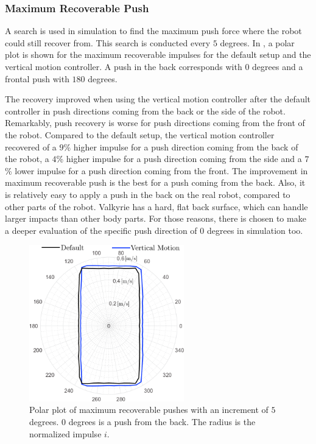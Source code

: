 \subsubsection{Maximum Recoverable Push} 
A search is used in simulation to find the maximum push force where the robot could still recover from. This search is conducted every $5$ degrees.  In , a polar plot is shown for the maximum recoverable impulses for the default setup and the vertical motion controller. A push in the back corresponds with $0$ degrees and a frontal push with $180$ degrees.

The recovery improved when using the vertical motion controller after the default controller in push directions coming from the back or the side of the robot. Remarkably, push recovery is worse for push directions coming from the front of the robot. Compared to the default setup, the vertical motion controller recovered of a $9$\% higher impulse for a push direction coming from the back of the robot, a $4$\% higher impulse for a push direction coming from the side and a $7$\% lower impulse for a push direction coming from the front. The improvement in maximum recoverable push is the best for a push coming from the back. Also, it is relatively easy to apply a push in the back on the real robot, compared to other parts of the robot. Valkyrie has a hard, flat back surface, which can handle larger impacts than other body parts. For those reasons, there is chosen to make a deeper evaluation of the specific push direction of $0$ degrees in simulation too.
\begin{figure}
\centering
\includegraphics[width=0.6\textwidth]{STYLESTUFF/roundStanding.png}
\caption{Polar plot of maximum recoverable pushes with an increment of $5$ degrees. $0$ degrees is a push from the back. The radius is the normalized impulse $i$. }
\label{fig:roundStanding}
\end{figure}

